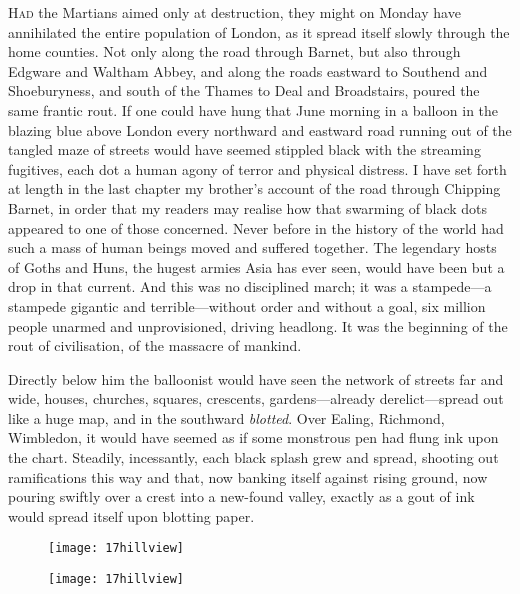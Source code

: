 

\lettrine[lines=4,findent=2pt]{H}{ad} the Martians aimed only at destruction, they might on Monday have annihilated the entire population of London, as it spread itself slowly through the home counties. Not only along the road through Barnet, but also through Edgware and Waltham Abbey, and along the roads eastward to Southend and Shoeburyness, and south of the Thames to Deal and Broadstairs, poured the same frantic rout. If one could have hung that June morning in a balloon in the blazing blue above London every northward and eastward road running out of the tangled maze of streets would have seemed stippled black with the streaming fugitives, each dot a human agony of terror and physical distress. I have set forth at length in the last chapter my brother's account of the road through Chipping Barnet, in order that my readers may realise how that swarming of black dots appeared to one of those concerned. Never before in the history of the world had such a mass of human beings moved and suffered together. The legendary hosts of Goths and Huns, the hugest armies Asia has ever seen, would have been but a drop in that current. And this was no disciplined march; it was a stampede—a stampede gigantic and terrible—without order and without a goal, six million people unarmed and unprovisioned, driving headlong. It was the beginning of the rout of civilisation, of the massacre of mankind.

Directly below him the balloonist would have seen the network of streets far and wide, houses, churches, squares, crescents, gardens—already derelict—spread out like a huge map, and in the southward \textit{blotted}. Over Ealing, Richmond, Wimbledon, it would have seemed as if some monstrous pen had flung ink upon the chart. Steadily, incessantly, each black splash grew and spread, shooting out ramifications this way and that, now banking itself against rising ground, now pouring swiftly over a crest into a new-found valley, exactly as a gout of ink would spread itself upon blotting paper.

\begin{letter}
	\begin{figure}[tb!]
	\centering
	\texttt{[image: 17hillview]}
	\end{figure}
\end{letter}

\begin{a4}
	\begin{figure}[tb!]
	\centering
	\texttt{[image: 17hillview]}
	\end{figure}
\end{a4}

